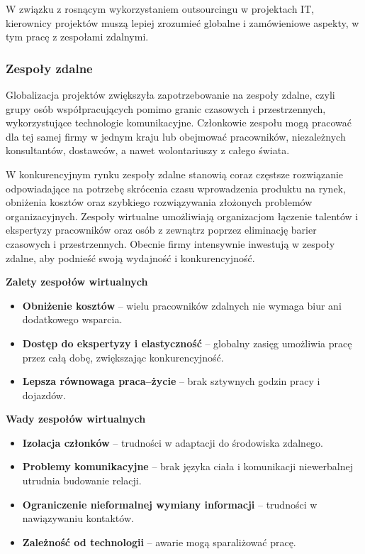 W związku z rosnącym wykorzystaniem outsourcingu w projektach IT, kierownicy projektów muszą lepiej zrozumieć globalne i zamówieniowe aspekty, w tym pracę z zespołami zdalnymi.\autocite{ITPM}  

\subsubsection{Zespoły zdalne}
Globalizacja projektów zwiększyła zapotrzebowanie na zespoły zdalne,\autocite{pmbok6} czyli grupy osób współpracujących pomimo granic czasowych i przestrzennych, wykorzystujące technologie komunikacyjne. Członkowie zespołu mogą pracować dla tej samej firmy w jednym kraju lub obejmować pracowników, niezależnych konsultantów, dostawców, a nawet wolontariuszy z całego świata.\autocite{ITPM}

W konkurencyjnym rynku zespoły zdalne stanowią coraz częstsze rozwiązanie odpowiadające na potrzebę skrócenia czasu wprowadzenia produktu na rynek, obniżenia kosztów oraz szybkiego rozwiązywania złożonych problemów organizacyjnych. Zespoły wirtualne umożliwiają organizacjom łączenie talentów i ekspertyzy pracowników oraz osób z zewnątrz poprzez eliminację barier czasowych i przestrzennych. Obecnie firmy intensywnie inwestują w zespoły zdalne, aby podnieść swoją wydajność i konkurencyjność.\autocite{ebrahim2009virtual}

\textbf{Zalety zespołów wirtualnych}  
\begin{itemize}
  \item \textbf{Obniżenie kosztów} – wielu pracowników zdalnych nie wymaga biur ani dodatkowego wsparcia.
  \item \textbf{Dostęp do ekspertyzy i elastyczność} – globalny zasięg umożliwia pracę przez całą dobę, zwiększając konkurencyjność.
  \item \textbf{Lepsza równowaga praca–życie} – brak sztywnych godzin pracy i dojazdów.
\end{itemize}

\textbf{Wady zespołów wirtualnych}  
\begin{itemize}
  \item \textbf{Izolacja członków} – trudności w adaptacji do środowiska zdalnego.
  \item \textbf{Problemy komunikacyjne} – brak języka ciała i komunikacji niewerbalnej utrudnia budowanie relacji.
  \item \textbf{Ograniczenie nieformalnej wymiany informacji} – trudności w nawiązywaniu kontaktów.
  \item \textbf{Zależność od technologii} – awarie mogą sparaliżować pracę.
\end{itemize}


